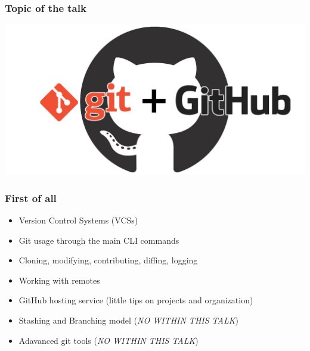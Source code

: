 \documentclass{beamer}
\begin{document}
\begin{frame}
	\frametitle{Topic of the talk}
	\addtocounter{nframe}{1}

	\begin{center}
		\includegraphics[width=.7\textwidth]{./imgs/git-github.jpeg}
	\end{center}


\end{frame}


\begin{frame}
	\frametitle{First of all}
	\addtocounter{nframe}{1}

	\begin{itemize}
		\item<1-> Version Control Systems (VCSs) 
		\item<2-> Git usage through the main CLI commands 
		\item<3-> Cloning, modifying, contributing, diffing, logging
		\item<4-> Working with remotes
		\item<5-> GitHub hosting service (little tips on projects and organization)
		\item<6-> Stashing and Branching model (\emph{NO WITHIN THIS TALK})
		\item<7-> Adavanced git tools (\emph{NO WITHIN THIS TALK})
	\end{itemize}

\end{frame}
\end{document}
